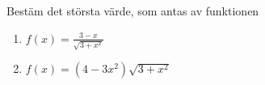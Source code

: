 


Bestäm det största värde, som antas av funktionen

\begin{enumerate}
\item $ f(x) =  \frac{3-x}{\sqrt{3+x^2}} $
\item $ f(x) =  (4-3x^2)\sqrt{3+x^2} $
\end{enumerate}